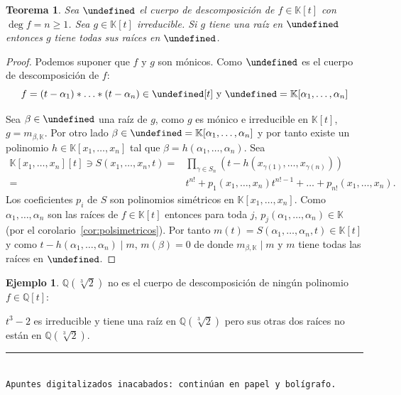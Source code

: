 \documentclass[10pt, spanish]{report}
\newtheorem{tma}{Teorema}[chapter]
\theoremstyle{definition}
\newtheorem*{ej}{Ejemplo}
\theoremstyle{custom}
\theoremstyle{remark}
\newcommand{\Q}{\mathbb{Q}}
\newcommand{\K}{\mathbb{K}}
\let\L\undefined
\newcommand{\L}{\mathbb{L}}
\renewcommand{\geq}{\geqslant}
\begin{document}
\begin{tma}
    Sea $\L$ el cuerpo de descomposición de $f\in\K[t]$ con $\deg{f}=n\geq1$.
    Sea $g\in\K[t]$ irreducible. Si $g$ tiene una raíz en $\L$ entonces $g$
    tiene todas sus raíces en $\L$.        
\end{tma}
\begin{proof}
    Podemos suponer que $f$ y $g$ son mónicos. Como $\L$ es el cuerpo de
    descomposición de $f$:  
    \[f=(t-\alpha_1)*\ldots*(t-\alpha_n)\in\L[t]\text{ y } \L=\K[\alpha_1,\ldots,\alpha_n]\] 

    Sea $\beta\in\L$ una raíz de $g$, como $g$ es mónico e irreducible en
    $\K[t]$, $g=m_{\beta,\K}$. Por otro lado $\beta\in\L=
    \K[\alpha_1,\ldots,\alpha_n]$ y por tanto existe un polinomio
    $h\in\K[x_1,\ldots,x_n]$ tal que $\beta=h(\alpha_1,\ldots,\alpha_n)$.   
    Sea
    \begin{align*}
        \K[x_1,\ldots,x_n][t]\ni S(x_1,\ldots,x_n,t)=&\prod_{\gamma\in S_n}
    \left(t-h(x_{\gamma(1)},\ldots,x_{\gamma(n)})\right)\\
        =& t^{n!}+p_1(x_1,\ldots,x_n)t^{n!-1}+\ldots+p_{n!}(x_1,\ldots,x_n).
    \end{align*}
    Los coeficientes $p_i$ de $S$ son polinomios simétricos en
    $\K[x_1,\ldots,x_n]$. Como $\alpha_1,\ldots,\alpha_n$ son las raíces de
    $f\in\K[t]$ entonces para toda $j$, $p_j(\alpha_1,\ldots,\alpha_n)\in\K$
    (por el corolario~\ref{cor:polsimetricos}). Por tanto
    $m(t)=S(\alpha_1,\ldots,\alpha_n,t)\in\K[t]$ y como
    $t-h(\alpha_1,\ldots,\alpha_n)\mid m$, $m(\beta)=0$ de donde
    $m_{\beta,\K}\mid m$ y $m$ tiene todas las raíces en $\L$.   
\end{proof}
\begin{ej}
    $\Q(\sqrt[3]{2})$ no es el cuerpo de descomposición de ningún polinomio
    $f\in\Q[t]$:

    $t^3-2$ es irreducible y tiene una raíz en $\Q(\sqrt[3]{2})$ pero sus otras
    dos raíces no están en $\Q(\sqrt[3]{2})$. 
\end{ej}

\vfill
\rule{17cm}{.5pt}\\[.15em] 
\texttt{\footnotesize Apuntes digitalizados inacabados: continúan en papel y bolígrafo.}\\
\end{document}
